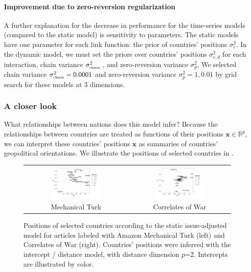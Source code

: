 \paragraph{Improvement due to zero-reversion regularization}
A further explanation for the decrease in performance for the
time-series models (compared to the static model) is sensitivity to
parameters.  The static models have one parameter for each link
function: the prior of countries' positions $\sigma_{c}^2$.  In the
dynamic model, we must set the priors over countries' positions
$\sigma_{c,d}^2$ for each interaction, chain variance
$\sigma_{\mbox{\tiny chain }}^2$, and zero-reversion variance
$\sigma_{p}^2$.  We selected chain variance $\sigma_{\mbox{\tiny
    chain}}^2=0.0001$ and zero-reversion variance $\sigma_p^2=1,0.01$
by grid search for these models at $3$ dimensions.

\subsubsection{A closer look}
What relationships between nations does this model infer?  Because the
relationships between countries are treated as functions of their
positions $\bm x \in \mathbb{R}^p$, we can interpret these countries'
positions $\bm x$ as summaries of countries' geopolitical
orientations.  We illustrate the positions of selected countries in
.

\begin{figure}
  \begin{tabular}{cc}
    \includegraphics[width=0.5\textwidth]{chapter_foreign_relations/figures/011_static_positions_mturk.pdf} &
    \includegraphics[width=0.5\textwidth]{chapter_foreign_relations/figures/011_static_positions_cow.pdf}
    \\
    Mechanical Turk & Correlates of War \\
  \end{tabular}
  \caption{Positions of selected countries according to the static
    issue-adjusted model for articles labeled with Amazon Mechanical
    Turk (left) and Correlates of War (right).  Countries' positions
    were inferred with the intercept / distance model, with distance
    dimension $p$=2.  Intercepts are illustrated by color.}
  \label{fig:fr_intercept_distance_positions}
\end{figure}

